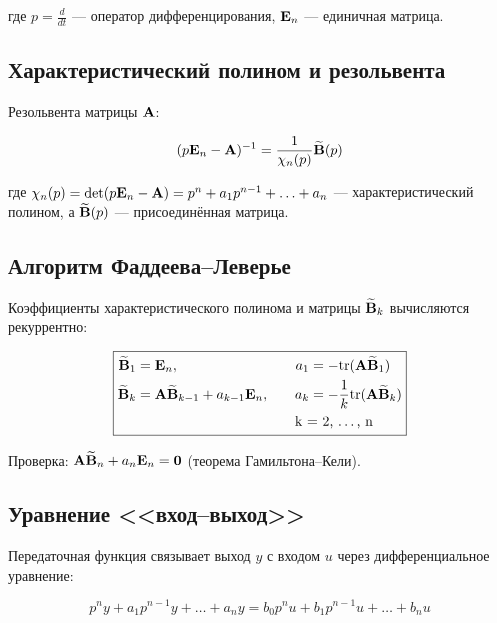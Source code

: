 где $p = \frac{d}{dt}$ --- оператор дифференцирования, $\mathbf{E}_n$ --- единичная матрица.

\subsection{Характеристический полином и резольвента}

Резольвента матрицы $\mathbf{A}$:

\begin{equation}
  (p\mathbf{E}_n - \mathbf{A})^{-1} = \frac{1}{\chi_n(p)}\widetilde{\mathbf{B}}(p)
  \label{eq:resolvent}
\end{equation}

где $\chi_n(p) = \det(p\mathbf{E}_n - \mathbf{A}) = p^n + a_1 p^{n-1} + \ldots + a_n$
--- характеристический полином, а $\widetilde{\mathbf{B}}(p)$ --- присоединённая матрица.

\subsection{Алгоритм Фаддеева--Леверье}
\label{sec:faddeev}

Коэффициенты характеристического полинома и матрицы
$\widetilde{\mathbf{B}}_k$ вычисляются рекуррентно:

\begin{equation}
  \boxed{
  \begin{aligned}
    \widetilde{\mat{B}}_1 &= \mat{E}_n, \quad & a_1 &= -\mathrm{tr}(\mat{A}\widetilde{\mat{B}}_1)\\
    \widetilde{\mat{B}}_k &= \mat{A}\widetilde{\mat{B}}_{k-1} + a_{k-1}\mat{E}_n, \quad
    & a_k &= -\frac{1}{k}\mathrm{tr}(\mat{A}\widetilde{\mat{B}}_k)\\
    & & \multicolumn{2}{l}{k = 2, \ldots, n}
  \end{aligned}
  }
  \label{eq:faddeev}
\end{equation}

Проверка: $\mathbf{A}\widetilde{\mathbf{B}}_n + a_n\mathbf{E}_n = \mathbf{0}$
(теорема Гамильтона--Кели).

\subsection{Уравнение <<вход--выход>>}

Передаточная функция связывает выход $y$ с входом $u$ через
дифференциальное уравнение:

\begin{equation}
  p^n y + a_1 p^{n-1} y + \ldots + a_n y = b_0 p^n u + b_1 p^{n-1} u + \ldots + b_n u
  \label{eq:io_equation}
\end{equation}

